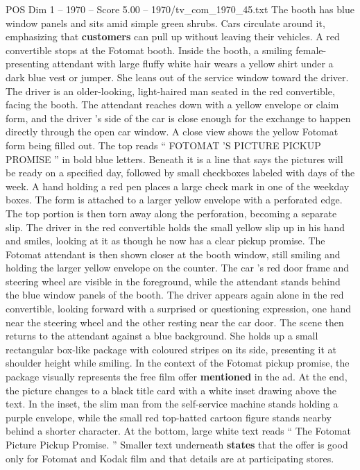 \begin{textsample}{POS Dim 1 – 1970 – Score 5.00 – 1970/tv\_com\_1970\_45.txt}
The booth has blue window panels and sits amid simple green shrubs.
Cars circulate around it, emphasizing that \textbf{customers} can pull up without leaving their vehicles.
A red convertible stops at the Fotomat booth.
Inside the booth, a smiling female-presenting attendant with large fluffy white hair wears a yellow shirt under a dark blue vest or jumper.
She leans out of the service window toward the driver.
The driver is an older-looking, light-haired man seated in the red convertible, facing the booth.
The attendant reaches down with a yellow envelope or claim form, and the driver ’s side of the car is close enough for the exchange to happen directly through the open car window.
A close view shows the yellow Fotomat form being filled out.
The top reads “ FOTOMAT ’S PICTURE PICKUP PROMISE ” in bold blue letters.
Beneath it is a line that says the pictures will be ready on a specified day, followed by small checkboxes labeled with days of the week.
A hand holding a red pen places a large check mark in one of the weekday boxes.
The form is attached to a larger yellow envelope with a perforated edge.
The top portion is then torn away along the perforation, becoming a separate slip.
The driver in the red convertible holds the small yellow slip up in his hand and smiles, looking at it as though he now has a clear pickup promise.
The Fotomat attendant is then shown closer at the booth window, still smiling and holding the larger yellow envelope on the counter.
The car ’s red door frame and steering wheel are visible in the foreground, while the attendant stands behind the blue window panels of the booth.
The driver appears again alone in the red convertible, looking forward with a surprised or questioning expression, one hand near the steering wheel and the other resting near the car door.
The scene then returns to the attendant against a blue background.
She holds up a small rectangular box-like package with coloured stripes on its side, presenting it at shoulder height while smiling.
In the context of the Fotomat pickup promise, the package visually represents the free film offer \textbf{mentioned} in the ad.
At the end, the picture changes to a black title card with a white inset drawing above the text.
In the inset, the slim man from the self-service machine stands holding a purple envelope, while the small red top-hatted cartoon figure stands nearby behind a shorter character.
At the bottom, large white text reads “ The Fotomat Picture Pickup Promise. ” Smaller text underneath \textbf{states} that the offer is good only for Fotomat and Kodak film and that details are at participating stores.

\end{textsample}
